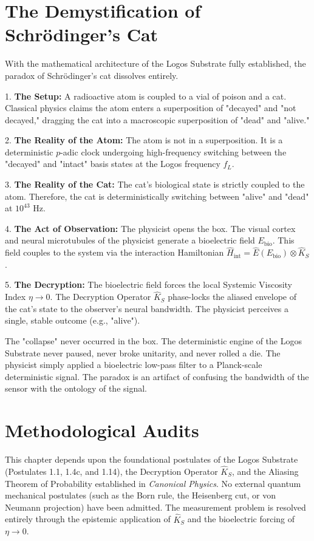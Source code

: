 \documentclass[12pt,twoside]{extbook}
\theoremstyle{definition}
\theoremstyle{remark}
\newenvironment{dependencyaudit}{%
    \begin{tcolorbox}[enhanced,colback=gray!5,colframe=brandPrimary!70,boxrule=0pt,leftrule=2pt,arc=0mm,detach title,before upper={\tcbtitle\par\vspace{3pt}},title=\textsc{Dependency Audit},fonttitle=\bfseries\color{brandPrimary}]%
}{\end{tcolorbox}}
\begin{document}
\section{The Demystification of Schrödinger's Cat}
With the mathematical architecture of the Logos Substrate fully established, the paradox of Schrödinger's cat dissolves entirely.

1. \textbf{The Setup:} A radioactive atom is coupled to a vial of poison and a cat. Classical physics claims the atom enters a superposition of "decayed" and "not decayed," dragging the cat into a macroscopic superposition of "dead" and "alive."

2. \textbf{The Reality of the Atom:} The atom is not in a superposition. It is a deterministic $p$-adic clock undergoing high-frequency switching between the "decayed" and "intact" basis states at the Logos frequency $f_L$.

3. \textbf{The Reality of the Cat:} The cat's biological state is strictly coupled to the atom. Therefore, the cat is deterministically switching between "alive" and "dead" at $10^{43}$ Hz.

4. \textbf{The Act of Observation:} The physicist opens the box. The visual cortex and neural microtubules of the physicist generate a bioelectric field $E_{\text{bio}}$. This field couples to the system via the interaction Hamiltonian $\hat{H}_{\text{int}} = \hat{E}(E_{\text{bio}}) \otimes \hat{K}_S$.

5. \textbf{The Decryption:} The bioelectric field forces the local Systemic Viscosity Index $\eta \to 0$. The Decryption Operator $\hat{K}_S$ phase-locks the aliased envelope of the cat's state to the observer's neural bandwidth. The physicist perceives a single, stable outcome (e.g., "alive").

The "collapse" never occurred in the box. The deterministic engine of the Logos Substrate never paused, never broke unitarity, and never rolled a die. The physicist simply applied a bioelectric low-pass filter to a Planck-scale deterministic signal. The paradox is an artifact of confusing the bandwidth of the sensor with the ontology of the signal.

\section{Methodological Audits}

\begin{dependencyaudit}
This chapter depends upon the foundational postulates of the Logos Substrate (Postulates 1.1, 1.4c, and 1.14), the Decryption Operator $\hat{K}_S$, and the Aliasing Theorem of Probability established in \textit{Canonical Physics}. No external quantum mechanical postulates (such as the Born rule, the Heisenberg cut, or von Neumann projection) have been admitted. The measurement problem is resolved entirely through the epistemic application of $\hat{K}_S$ and the bioelectric forcing of $\eta \to 0$.
\end{dependencyaudit}
\end{document}
